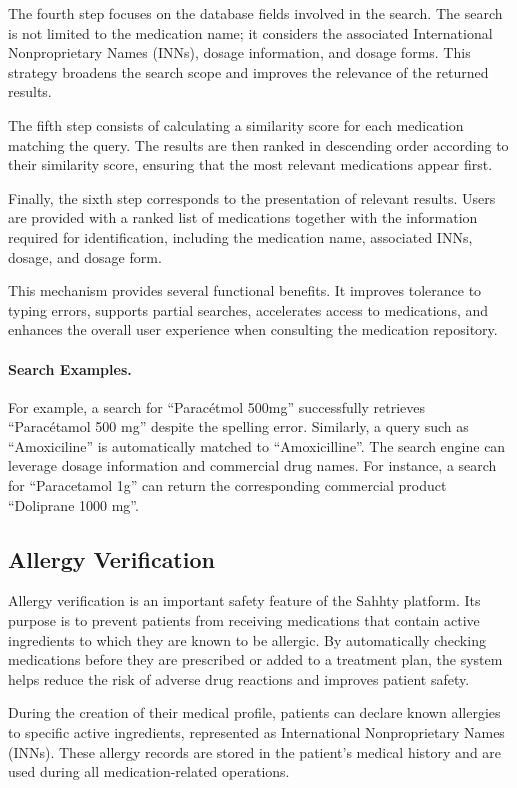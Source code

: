 The fourth step focuses on the database fields involved in the search. The search is not limited to the medication name; it  considers the associated International Nonproprietary Names (INNs), dosage information, and dosage forms. This strategy broadens the search scope and improves the relevance of the returned results.

The fifth step consists of calculating a similarity score for each medication matching the query. The results are then ranked in descending order according to their similarity score, ensuring that the most relevant medications appear first.

Finally, the sixth step corresponds to the presentation of relevant results. Users are provided with a ranked list of medications together with the information required for identification, including the medication name, associated INNs, dosage, and dosage form.

This mechanism provides several functional benefits. It improves tolerance to typing errors, supports partial searches, accelerates access to medications, and enhances the overall user experience when consulting the medication repository.

\paragraph{Search Examples.} For example, a search for ``Paracétmol 500mg'' successfully retrieves ``Paracétamol 500 mg'' despite the spelling error. Similarly, a query such as ``Amoxiciline'' is automatically matched to ``Amoxicilline''. The search engine can leverage dosage information and commercial drug names. For instance, a search for ``Paracetamol 1g'' can return the corresponding commercial product ``Doliprane 1000 mg''.


\subsection{Allergy Verification}
\label{subsec:allergy_verification}

Allergy verification is an important safety feature of the Sahhty platform. Its purpose is to prevent patients from receiving medications that contain active ingredients to which they are known to be allergic. By automatically checking medications before they are prescribed or added to a treatment plan, the system helps reduce the risk of adverse drug reactions and improves patient safety.

During the creation of their medical profile, patients can declare known allergies to specific active ingredients, represented as International Nonproprietary Names (INNs). These allergy records are stored in the patient's medical history and are used during all medication-related operations.

